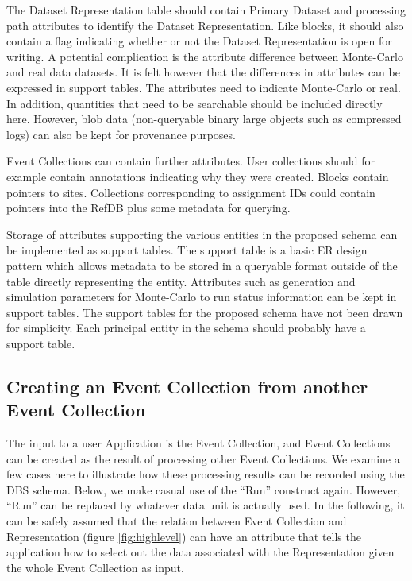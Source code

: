 \documentclass{cmspaper}
\begin{document}
The Dataset Representation table should contain Primary Dataset and processing path 
attributes to identify the Dataset Representation.  
Like blocks, it should also contain a flag indicating whether or not the Dataset Representation 
is open for writing.  A potential complication is the attribute 
difference between Monte-Carlo and real data 
datasets.  It is felt however that the differences in attributes can be expressed in support 
tables.  The attributes need to indicate Monte-Carlo or real.  In 
addition, quantities that need to be searchable should be included directly here.  However, 
blob data (non-queryable binary large objects such as compressed logs) can also be kept for provenance 
purposes.  

Event Collections can contain further attributes.  User collections should for 
example contain annotations indicating why they were created.  Blocks contain 
pointers to sites.  Collections corresponding to assignment IDs could contain pointers 
into the RefDB plus some metadata for querying.

Storage of attributes supporting the various 
entities in the proposed schema can be implemented as support tables.  The support table 
is a basic ER design pattern which allows metadata to be stored in a queryable format 
outside of the table directly representing the entity.  Attributes such as generation and 
simulation parameters for Monte-Carlo to run status information can be kept in support 
tables.   The support tables for the proposed schema have not been drawn for simplicity.  
Each principal entity in the schema should probably have a support table.

\subsection{Creating an Event Collection from another Event Collection}
\label{sec:createEvColl}

The input to a user Application is the Event Collection, and Event Collections can be 
created as the result of processing other Event Collections.  We examine a few cases 
here to illustrate how these processing results can be recorded using the DBS schema.
Below, we make casual use of the ``Run'' construct again.  However, ``Run'' can be replaced
by whatever data unit is actually used.  In the following,
it can be safely assumed that the relation between Event Collection and Representation 
(figure \ref{fig:highlevel}) can have an attribute that tells the application how to select 
out the data associated with the Representation given the whole Event Collection as
input.  
\end{document}
